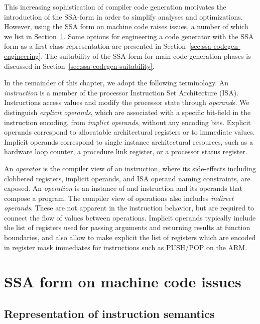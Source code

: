 This increasing sophistication of compiler code generation motivates the
introduction of the SSA-form in order to simplify analyses and optimizations.
However, using the SSA form on machine code raises issues, a number of
which we list in Section~\ref{sec:ssa-codegen-issues}.  Some options for
engineering a code generator with the SSA form as a first class representation
are presented in Section~\ref{sec:ssa-codegen-engineering}.  The suitability of
the SSA form for main code generation phases is discussed in
Section~\ref{sec:ssa-codegen-suitability}.

In the remainder of this chapter, we adopt the following terminology. An
\emph{instruction} is a member of the processor Instruction Set Architecture
(ISA). Instructions access values and modify the processor state through
\emph{operand}s. We distinguish \emph{explicit operands}, which are associated
with a specific bit-field in the instruction encoding, from \emph{implict
operands}, without any encoding bits. Explicit operands correspond to
allocatable architectural registers or to immediate values. Implicit operands
correspond to single instance architectural resources, such as a hardware loop
counter, a procedure link register, or a processor status register.

An \emph{operator} is the compiler view of an instruction, where its
side-effects including clobbered registers, implicit operands, and ISA operand
naming constraints, are exposed. An \emph{operation} is an instance of and
instruction and its operands that compose a program. The compiler view of
operations also includes \emph{indirect operands}. These are not apparent in the
instruction behavior, but are required to connect the flow of values between
operations. Implicit operands typically include the list of registers used for
passing arguments and returning results at function boundaries, and also allow
to make explicit the list of registers which are encoded in register mask
immediates for instructions such as PUSH/POP on the ARM.

\section{SSA form on machine code issues}
\label{sec:ssa-codegen-issues}

\subsection{Representation of instruction semantics}

